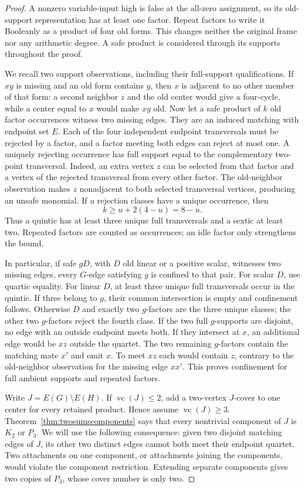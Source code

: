 \documentclass[11pt]{article}
\newcommand{\vc}{\operatorname{vc}}
\theoremstyle{definition}
\theoremstyle{remark}
\begin{document}
\begin{proof}
A nonzero variable-input high is false at the all-zero assignment, so its old-support representation has at least one factor. Repeat factors to write it Booleanly as a product of four old forms. This changes neither the original frame nor any arithmetic degree. A safe product is considered through its supports throughout the proof.

We recall two support observations, including their full-support qualifications. If $xy$ is missing and an old form contains $y$, then $x$ is adjacent to no other member of that form: a second neighbor $z$ and the old center would give a four-cycle, while a center equal to $x$ would make $xy$ old. Now let a safe product of $k$ old factor occurrences witness two missing edges. They are an induced matching with endpoint set $E$. Each of the four independent endpoint transversals must be rejected by a factor, and a factor meeting both edges can reject at most one. A uniquely rejecting occurrence has full support equal to the complementary two-point transversal. Indeed, an extra vertex $z$ can be selected from that factor and a vertex of the rejected transversal from every other factor. The old-neighbor observation makes $z$ nonadjacent to both selected transversal vertices, producing an unsafe monomial. If $u$ rejection classes have a unique occurrence, then
\[
k\ge u+2(4-u)=8-u.
\]
Thus a quintic has at least three unique full transversals and a sextic at least two. Repeated factors are counted as occurrences; an idle factor only strengthens the bound.

In particular, if safe $gD$, with $D$ old linear or a positive scalar, witnesses two missing edges, every $G$-edge satisfying $g$ is confined to that pair. For scalar $D$, use quartic equality. For linear $D$, at least three unique full transversals occur in the quintic. If three belong to $g$, their common intersection is empty and confinement follows. Otherwise $D$ and exactly two $g$-factors are the three unique classes; the other two $g$-factors reject the fourth class. If the two full $g$-supports are disjoint, no edge with an outside endpoint meets both. If they intersect at $x$, an additional edge would be $xz$ outside the quartet. The two remaining $g$-factors contain the matching mate $x'$ and omit $x$. To meet $xz$ each would contain $z$, contrary to the old-neighbor observation for the missing edge $xx'$. This proves confinement for full ambient supports and repeated factors.

Write $J=E(G)\setminus E(H)$. If $\vc(J)\le2$, add a two-vertex $J$-cover to one center for every retained product. Hence assume $\vc(J)\ge3$. Theorem~\ref{thm:twosumscomponents} says that every nontrivial component of $J$ is $K_2$ or $P_3$. We will use the following consequence: given two disjoint matching edges of $J$, its other two distinct edges cannot both meet their endpoint quartet. Two attachments on one component, or attachments joining the components, would violate the component restriction. Extending separate components gives two copies of $P_3$, whose cover number is only two.


\end{proof}
\end{document}
